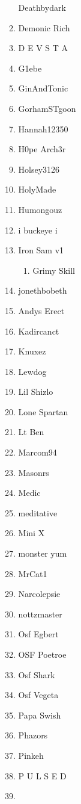 \documentclass{article}
\begin{document}
\begin{enumerate}[I]
\begin{enumerate}[I]
	Deathbydark
      \item
	Demonic Rich
      \item
	D E V S T A
      \item
	G1ebe
      \item
	GinAndTonic
      \item
	GorhamSTgoon
      \item
	Hannah12350
      \item
	H0pe Arch3r
      \item
	Holsey3126
      \item
	HolyMade
      \item
	Humongouz
      \item
	i buckeye i
      \item
	Iron Sam v1
	  \begin{enumerate}[I]
	    \item
	      Grimy Skill
	  \end{enumerate}
      \item
	jonethbobeth
      \item
	Andys Erect
      \item
	Kadircanct
      \item
	Knuxez
      \item
	Lewdog
      \item
	Lil Shizlo
      \item
	Lone Spartan
      \item
	Lt Ben
      \item
	Marcom94
      \item
	Masonrs
      \item
	Medic
      \item
	meditative
      \item
	Mini X
      \item
	monster yum
      \item
	MrCat1
      \item
	Narcolepsie
      \item
	nottzmaster
      \item
	Osf Egbert
      \item
	OSF Poetroe
      \item
	Osf Shark
      \item
	Osf Vegeta
      \item
	Papa Swish
      \item
	Phazors
      \item
	Pinkeh
      \item
	P U L S E D
      \item

\end{enumerate}
\end{enumerate}
\end{document}
